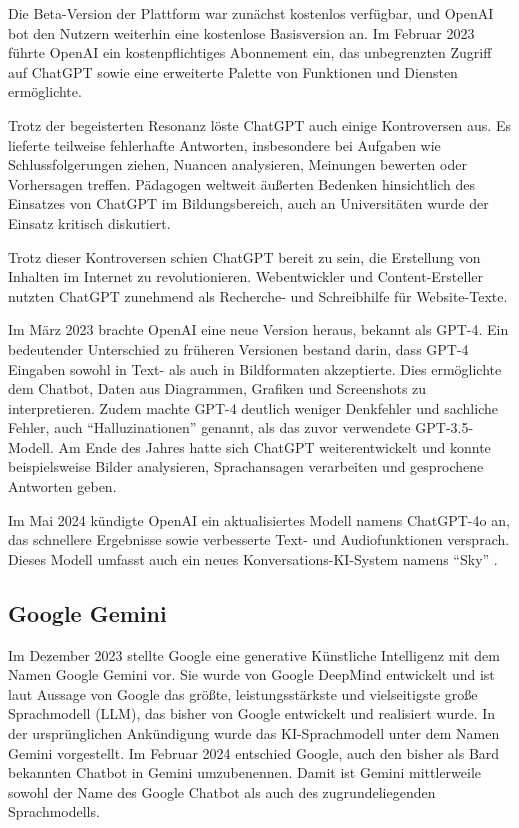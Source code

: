 Die Beta-Version der Plattform war zunächst kostenlos verfügbar, und OpenAI bot den Nutzern weiterhin eine kostenlose 
Basisversion an. Im Februar 2023 führte OpenAI ein kostenpflichtiges Abonnement ein, das unbegrenzten Zugriff auf ChatGPT 
sowie eine erweiterte Palette von Funktionen und Diensten ermöglichte.

Trotz der begeisterten Resonanz löste ChatGPT auch einige Kontroversen aus. Es lieferte teilweise fehlerhafte Antworten, 
insbesondere bei Aufgaben wie Schlussfolgerungen ziehen, Nuancen analysieren, Meinungen bewerten oder Vorhersagen treffen. 
Pädagogen weltweit äußerten Bedenken hinsichtlich des Einsatzes von ChatGPT im Bildungsbereich, auch an Universitäten wurde 
der Einsatz kritisch diskutiert.

Trotz dieser Kontroversen schien ChatGPT bereit zu sein, die Erstellung von Inhalten im Internet zu revolutionieren. 
Webentwickler und Content-Ersteller nutzten ChatGPT zunehmend als Recherche- und Schreibhilfe für Website-Texte.

Im März 2023 brachte OpenAI eine neue Version heraus, bekannt als GPT-4. Ein bedeutender Unterschied zu früheren Versionen 
bestand darin, dass GPT-4 Eingaben sowohl in Text- als auch in Bildformaten akzeptierte. Dies ermöglichte dem Chatbot, Daten 
aus Diagrammen, Grafiken und Screen\-shots zu interpretieren. Zudem machte GPT-4 deutlich weniger Denkfehler und sachliche Fehler, 
auch ``Halluzinationen'' genannt, als das zuvor verwendete GPT-3.5-Modell. Am Ende des Jahres hatte sich ChatGPT weiterentwickelt 
und konnte beispielsweise Bilder analysieren, Sprachansagen verarbeiten und gesprochene Antworten geben.

Im Mai 2024 kündigte OpenAI ein aktualisiertes Modell namens ChatGPT-4o an, das schnellere Ergebnisse sowie verbesserte 
Text- und Audiofunktionen versprach. Dieses Modell umfasst auch ein neues Konversations-KI-System namens ``Sky'' \cite{GrundlagenChatGPT}.

\subsection{Google Gemini}  \label{Google Gemini}

Im Dezember 2023 stellte Google eine generative Künstliche Intelligenz mit dem Namen Google Gemini vor. Sie wurde von Google DeepMind 
entwickelt und ist laut Aussage von Google das größte, leistungsstärkste und vielseitigste große Sprachmodell (LLM), das bisher von 
Google entwickelt und realisiert wurde. In der ursprünglichen Ankündigung wurde das KI-Sprachmodell unter dem Namen Gemini vorgestellt. 
Im Februar 2024 entschied Google, auch den bisher als Bard bekannten Chatbot in Gemini umzubenennen. Damit ist Gemini mittlerweile sowohl
der Name des Google Chatbot als auch des zugrundeliegenden Sprachmodells.

